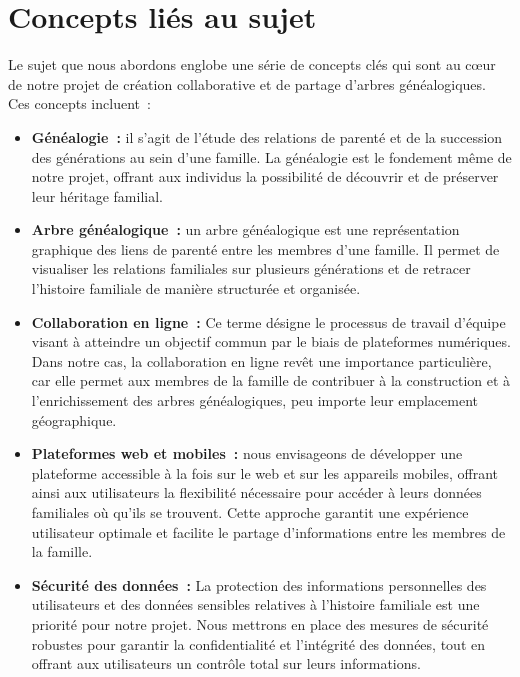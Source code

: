 \section{Concepts liés au sujet}
Le sujet que nous abordons englobe une série de concepts clés qui sont au cœur
de notre projet de création collaborative et de partage d’arbres généalogiques.
Ces concepts incluent :
\begin{itemize}
  \item \textbf{Généalogie :} il s’agit de l’étude des relations de parenté et de la
    succession des générations au sein d’une famille. La généalogie est le
    fondement même de notre projet, offrant aux individus la possibilité de
    découvrir et de préserver leur héritage familial.

  \item \textbf{Arbre généalogique :} un arbre généalogique est une représentation graphique
    des liens de parenté entre les membres d’une famille. Il permet de visualiser
    les relations familiales sur plusieurs générations et de retracer l’histoire
    familiale de manière structurée et organisée.

  \item \textbf{Collaboration en ligne :} Ce terme désigne le processus de travail d’équipe
    visant à atteindre un objectif commun par le biais de plateformes numériques.
    Dans notre cas, la collaboration en ligne revêt une importance particulière,
    car elle permet aux membres de la famille de contribuer à la construction et
    à l’enrichissement des arbres généalogiques, peu importe leur emplacement géographique.

  \item \textbf{Plateformes web et mobiles :} nous envisageons de développer une plateforme
    accessible à la fois sur le web et sur les appareils mobiles, offrant ainsi
    aux utilisateurs la flexibilité nécessaire pour accéder à leurs données
    familiales où qu’ils se trouvent. Cette approche garantit une expérience
    utilisateur optimale et facilite le partage d’informations entre les membres de la famille.

  \item \textbf{Sécurité des données :} La protection des informations personnelles des
    utilisateurs et des données sensibles relatives à l’histoire familiale est
    une priorité pour notre projet. Nous mettrons en place des mesures de sécurité
    robustes pour garantir la confidentialité et l’intégrité des données, tout en
    offrant aux utilisateurs un contrôle total sur leurs informations.


\end{itemize}
